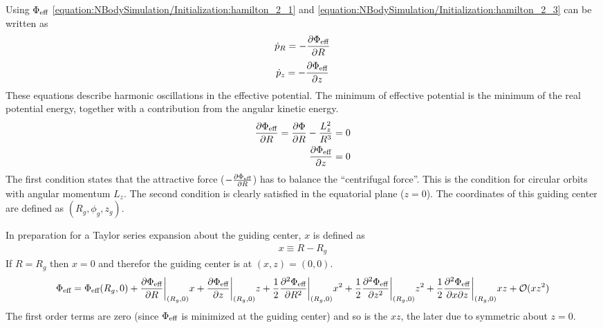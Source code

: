 \documentclass[letterpaper,10pt,english]{sphinxmanual}
\begin{document}
\sphinxAtStartPar
Using \(\Phi_{\textup{eff}}\) \eqref{equation:NBodySimulation/Initialization:hamilton_2_1} and \eqref{equation:NBodySimulation/Initialization:hamilton_2_3} can be written as
\begin{equation}\label{equation:NBodySimulation/Initialization:hamilton_eff_1}
\begin{split}\dot{p}_{R} = -\frac{\partial \Phi_{\textup{eff}} }{\partial R}\end{split}
\end{equation}\begin{equation}\label{equation:NBodySimulation/Initialization:hamilton_eff_2}
\begin{split}\dot{p}_{z} = -\frac{\partial \Phi_{\textup{eff}} }{\partial z}\end{split}
\end{equation}
\sphinxAtStartPar
These equations describe harmonic oscillations in the effective potential.
The minimum of effective potential is the minimum of the real potential energy, together with a contribution from the angular kinetic energy.
\begin{equation*}
\begin{split}\frac{\partial \Phi_{\textup{eff}} }{\partial R} = \frac{\partial \Phi }{\partial R} - \frac{L_z^2}{R^3} =0 \\
\frac{\partial \Phi_{\textup{eff}} }{\partial z} = 0\end{split}
\end{equation*}
\sphinxAtStartPar
The first condition states that the attractive force (\(-\frac{\partial \Phi_{\textup{eff}} }{\partial R}\)) has to balance the “centrifugal force”.
This is the condition for circular orbits with angular momentum \(L_z\).
The second condition is clearly satisfied in the equatorial plane (\(z=0\)).
The coordinates of this guiding center are defined as \((R_g,\phi_g,z_g)\).

\sphinxAtStartPar
In preparation for a Taylor series expansion about the guiding center, \(x\) is defined as
\begin{equation*}
\begin{split}x \equiv R - R_g\end{split}
\end{equation*}
\sphinxAtStartPar
If \(R = R_g\) then \(x=0\) and therefor the guiding center is at \((x,z) = (0,0)\).
\begin{equation*}
\begin{split}\Phi_{\textup{eff}} = \Phi_{\textup{eff}}(R_g,0) +
\frac{\partial \Phi_{\textup{eff}} }{\partial R}\bigg|_{(R_g,0)}x +
\frac{\partial \Phi_{\textup{eff}} }{\partial z}\bigg|_{(R_g,0)}z +
\frac{1}{2}\frac{\partial^2 \Phi_{\textup{eff}} }{\partial R^2}\bigg|_{(R_g,0)}x^2 +
\frac{1}{2}\frac{\partial^2 \Phi_{\textup{eff}} }{\partial z^2}\bigg|_{(R_g,0)}z^2 +
\frac{1}{2}\frac{\partial^2 \Phi_{\textup{eff}} }{\partial x\partial z}\bigg|_{(R_g,0)}xz +
\mathcal{O}(xz^2)\end{split}
\end{equation*}
\sphinxAtStartPar
The first order terms are zero (since \(\Phi_{\textup{eff}}\) is minimized at the guiding center) and so is the \(xz\), the later due to symmetric about \(z=0\).
\end{document}
